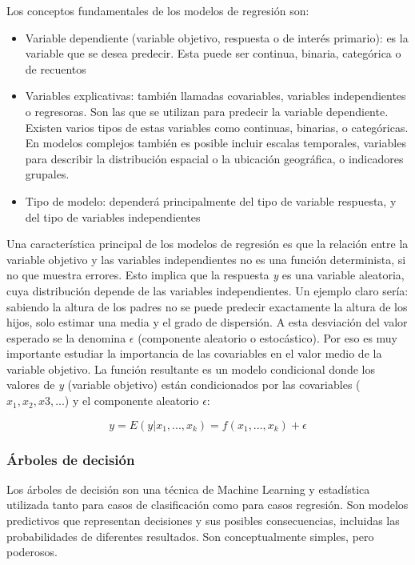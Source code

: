 \documentclass[12pt,a4paper,Spanish]{article}
\begin{document}
Los conceptos fundamentales de los modelos de regresión son:
\begin{itemize}
	\item Variable dependiente (variable objetivo, respuesta o de interés primario): es la variable que se desea predecir. Esta puede ser continua, binaria, categórica o de recuentos
	\item Variables explicativas: también llamadas covariables, variables independientes o regresoras. Son las que se utilizan para predecir la variable dependiente. Existen varios tipos de estas variables como continuas, binarias, o categóricas. En modelos complejos también es posible incluir escalas temporales, variables para describir la distribución espacial o la ubicación geográfica, o indicadores grupales.
	\item Tipo de modelo: dependerá principalmente del tipo de variable respuesta, y del tipo de variables independientes
\end{itemize}

Una característica principal de los modelos de regresión es que la relación entre la variable objetivo y las variables independientes no es una función determinista, si no que muestra errores. Esto implica que la respuesta \textit{y} es una variable aleatoria, cuya distribución depende de las variables independientes. Un ejemplo claro sería: sabiendo la altura de los padres no se puede predecir exactamente la altura de los hijos, solo estimar una media y el grado de dispersión. A esta desviación del valor esperado se la denomina $\epsilon$ (componente aleatorio o estocástico). Por eso es muy importante estudiar la importancia de las covariables en el valor medio de la variable objetivo. La función resultante es un modelo condicional donde los valores de \textit{y} (variable objetivo) están condicionados por las covariables ($x_1, x_2, x3, ...$) y el componente aleatorio $\epsilon$:

\begin{equation}
	y = E(y|x_1, ..., x_k) = f(x_1, ..., x_k) + \epsilon 
\end{equation}


\subsubsection{Árboles de decisión}\label{decision_tree}
Los árboles de decisión son una técnica de Machine Learning y estadística utilizada tanto para casos de clasificación como para casos regresión. Son modelos predictivos que representan decisiones y sus posibles consecuencias, incluidas las probabilidades de diferentes resultados. Son conceptualmente simples, pero poderosos.
\newline
\end{document}
